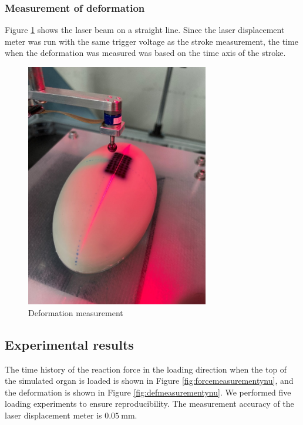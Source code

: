 \subsubsection*{Measurement of deformation}
Figure \ref{fig:defmeasureynu} shows the laser beam on a straight line. Since the laser displacement meter was run with the same trigger voltage as the stroke measurement, the time when the deformation was measured was based on the time axis of the stroke.
\begin{figure}%
	\centering
   \quad
   \includegraphics[width=8cm]{Images/appendix/ynu/fig5laserlineonthesimulatedorgan.png}%
   \caption{Deformation measurement}%
   \label{fig:defmeasureynu}%
\end{figure}

\subsection*{Experimental results}
The time history of the reaction force in the loading direction when the top of the simulated organ is loaded is shown 
in Figure \ref{fig:forcemeasurementynu}, and the deformation is shown in Figure \ref{fig:defmeasurementynu}. 
We performed five loading experiments to ensure reproducibility. The measurement accuracy of the laser displacement meter is
$\SI{0.05}{\milli \m}$.

